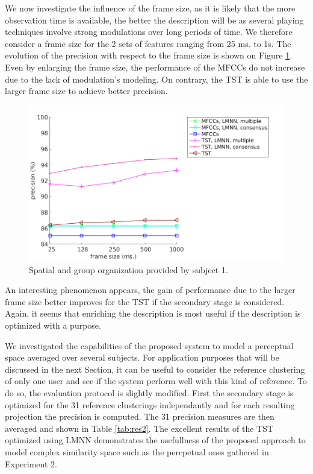 \documentclass{article}
\begin{document}
We now investigate the influence of the frame size, as it is likely that the more observation time is available, the better the description will be as several playing techniques involve strong modulations over long periods of time. We therefore consider a frame size for the 2 sets of features ranging from 25 ms. to 1s. The evolution of the precision with respect to the frame size is shown on Figure \ref{fig:frame}. Even by enlarging the frame size, the performance of the MFCCs do not increase due to the lack of modulation's modeling. On contrary, the TST is able to use the larger frame size to achieve better precision.

\begin{figure}
\center
\includegraphics[width = \textwidth]{figures/frame.png}
\caption{Spatial and group organization provided by subject 1.}
\label{fig:frame}
\end{figure}

An interesting phenomenon appears, the gain of performance due to the larger frame size better improves for the TST if the secondary stage is considered. Again, it seems that enriching the description is most useful if the description is optimized with a purpose.

We investigated the capabilities of the proposed system to model a perceptual space averaged over several subjects. For application purposes that will be discussed in the next Section, it can be useful to consider the reference clustering of only one user and see if the system perform well with this kind of reference. To do so, the evaluation protocol is slightly modified. First the secondary stage is optimized for the 31 reference clusterings independantly and for each resulting projection the precision is computed. The 31 precision measures are then averaged and shown in Table \ref{tab:res2}. The excellent results of the TST optimized using LMNN demonstrates the usefullness of the proposed approach to model complex similarity space such as the percpetual ones gathered in Experiment 2.
\end{document}
